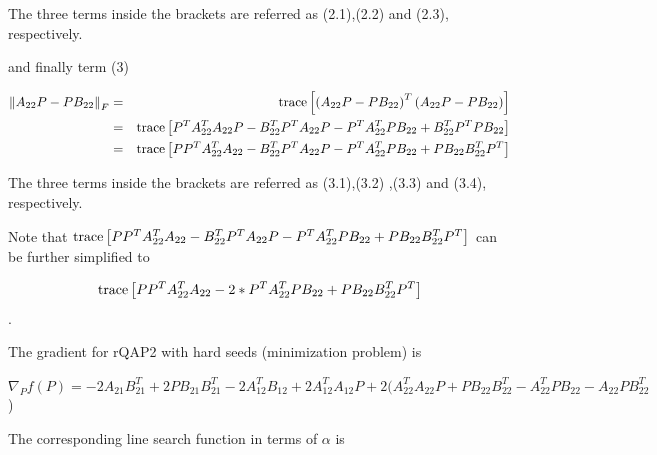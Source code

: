 \documentclass[12pt,oneside,final]{thesis}\usepackage[]{graphicx}\usepackage[]{color}
\begin{document}
The three terms inside the brackets are referred as (2.1),(2.2) and
(2.3), respectively.

and finally term (3)

\begin{align*}
\left\Vert A_{22}P-PB_{22}\right\Vert _{F} & = & \textup{trace}\left[\left(A_{22}P-PB_{22}\right)^{T}\left(A_{22}P-PB_{22}\right)\right]\\
 & = & \textup{trace}\left[P^{T}A_{22}^{T}A_{22}P-B_{22}^{T}P^{T}A_{22}P-P^{T}A_{22}^{T}PB_{22}+B_{22}^{T}P^{T}PB_{22}\right]\\
 & = & \textup{trace}\left[PP^{T}A_{22}^{T}A_{22}-B_{22}^{T}P^{T}A_{22}P-P^{T}A_{22}^{T}PB_{22}+PB_{22}B_{22}^{T}P^{T}\right]
\end{align*}


The three terms inside the brackets are referred as (3.1),(3.2) ,(3.3)
and (3.4), respectively.

Note that $\textup{trace}\left[PP^{T}A_{22}^{T}A_{22}-B_{22}^{T}P^{T}A_{22}P-P^{T}A_{22}^{T}PB_{22}+PB_{22}B_{22}^{T}P^{T}\right]$
can be further simplified to 

\[
\textup{trace}\left[PP^{T}A_{22}^{T}A_{22}-2*P^{T}A_{22}^{T}PB_{22}+PB_{22}B_{22}^{T}P^{T}\right]
\]
.


The gradient for rQAP2 with hard seeds (minimization problem) is

$\nabla_{P}f(P)=-2A_{21}B_{21}^{T}+2PB_{21}B_{21}^{T}-2A_{12}^{T}B_{12}+2A_{12}^{T}A_{12}P+2(A_{22}^{T}A_{22}P+PB_{22}B_{22}^{T}-A_{22}^{T}PB_{22}-A_{22}PB_{22}^{T}$)

\begin{flushleft}
The corresponding line search function in terms of $\alpha$ is
\par\end{flushleft}
\end{document}
